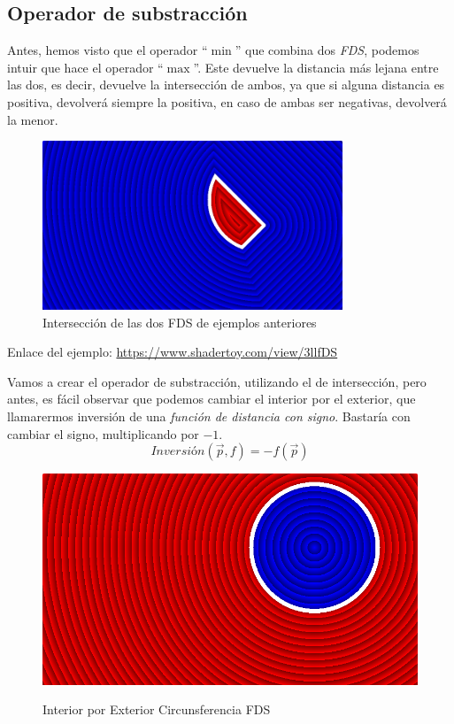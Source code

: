 \subsection{Operador de substracción}
Antes, hemos visto que el operador \enquote{\(\min\)} que combina dos \textit{FDS}, podemos intuir que hace el operador \enquote{\(\max\)}. Este devuelve la distancia más lejana entre las dos, es decir, devuelve la intersección de ambos, ya que si alguna distancia es positiva, devolverá siempre la positiva, en caso de ambas ser negativas, devolverá la menor.

\begin{figure}[H]
  \centering
  \captionsetup{justification=centering}%
  \includegraphics[width=0.8\textwidth]{secciones/imagenes/sdf/2d/sdf_subtract-1.png}
  \caption{Intersección de las dos FDS de ejemplos anteriores}
  \label{fig:disyunccion}
\end{figure}

Enlace del ejemplo:
\url{https://www.shadertoy.com/view/3llfDS}

Vamos a crear el operador de substracción, utilizando el de intersección, pero antes, es fácil observar que podemos cambiar el interior por el exterior, que llamarermos inversión de una \textit{función de distancia con signo}. Bastaría con cambiar el signo, multiplicando por \(-1\).
\[ Inversión(\Vec{p}, f) = -f(\Vec{p}) \]

\begin{figure}[H]
  \centering
  \captionsetup{justification=centering}%
  \includegraphics[width=1.0\textwidth]{secciones/imagenes/sdf/2d/sdf_subtract-2.png}\label{fig:negative}
  \caption{ Interior por Exterior Circunsferencia FDS}
\end{figure}

